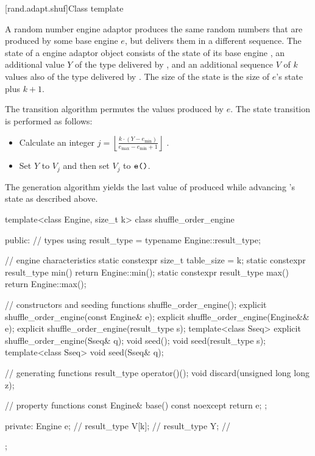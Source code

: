 [rand.adapt.shuf]{Class template }%
%

\pnum
A  random number engine adaptor
produces the same random numbers
that are produced by some base engine $e$,
but delivers them in a different sequence.
The state%
%
of a  engine adaptor object 
consists of
 the state  of its base engine ,
 an additional value $Y$ of the type delivered by ,
and
 an additional sequence $V$ of $k$ values
 also of the type delivered by .
The size of the state is
 the size of $e$'s state plus $k + 1$.

\pnum
The transition algorithm%
%
permutes the values produced by $e$.
The state transition is performed as follows:
\begin{itemize}
 \item
   Calculate an integer
   $j = \left\lfloor \frac{k \cdot (Y - e_{\min})}
                          {e_{\max} - e_{\min} +1}
        \right\rfloor
   $%
   .
 \item
   Set $Y$ to $V_j$ and then set $V_j$ to $\texttt{e()}$.
\end{itemize}

\pnum
The generation algorithm%
%
yields the last value of 
 produced while advancing 's state as described above.

%
\begin{codeblock}
template<class Engine, size_t k>
  class shuffle_order_engine {
  public:
    // types
    using result_type = typename Engine::result_type;

    // engine characteristics
    static constexpr size_t table_size = k;
    static constexpr result_type min() { return Engine::min(); }
    static constexpr result_type max() { return Engine::max(); }

    // constructors and seeding functions
    shuffle_order_engine();
    explicit shuffle_order_engine(const Engine& e);
    explicit shuffle_order_engine(Engine&& e);
    explicit shuffle_order_engine(result_type s);
    template<class Sseq> explicit shuffle_order_engine(Sseq& q);
    void seed();
    void seed(result_type s);
    template<class Sseq> void seed(Sseq& q);

    // generating functions
    result_type operator()();
    void discard(unsigned long long z);

    // property functions
    const Engine& base() const noexcept { return e; };

  private:
    Engine e;           // \expos
    result_type V[k];   // \expos
    result_type Y;      // \expos
  };
\end{codeblock}


